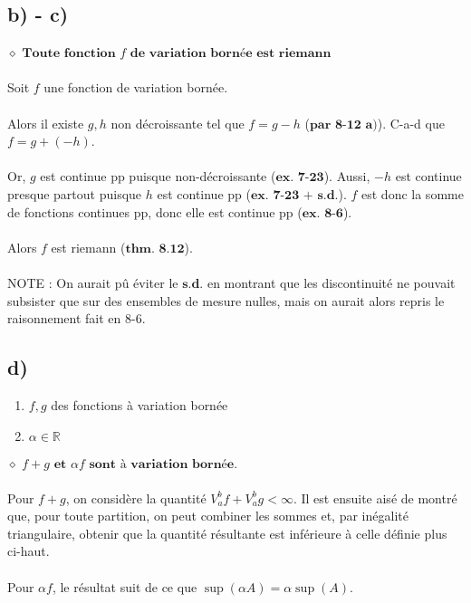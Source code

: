 \documentclass[a4paper,10pt]{article}
\begin{document}
\subsection*{b) - c)}
$\diamond$ $\textbf{Toute fonction } f \textbf{ de variation bornée est riemann}$
\\
\\
Soit $f$ une fonction de variation bornée. 
\\
\\
Alors il existe $g,h$ non décroissante tel que $f = g-h$ ($\textbf{par 8-12 a)}$).
C-a-d que $f = g+(-h)$. 
\\
\\
Or, $g$ est continue pp puisque non-décroissante ($\textbf{ex. 7-23}$). Aussi, $-h$ est continue presque partout puisque
$h$ est continue pp ($\textbf{ex. 7-23 + s.d.}$). $f$ est donc la somme de fonctions continues pp, donc elle est continue pp ($\textbf{ex. 8-6}$).
\\
\\
Alors $f$ est riemann ($\textbf{thm. 8.12}$).
\\
\\
NOTE : On aurait pû éviter le $\textbf{s.d.}$ en montrant que les discontinuité ne pouvait subsister que sur des ensembles de mesure nulles,
mais on aurait alors repris le raisonnement fait en 8-6.

\subsection*{d)}
\begin{enumerate}
 \item $f,g$ des fonctions à variation bornée
 \item $\alpha \in \mathbb{R}$
\end{enumerate}
$\diamond$ $f+g \textbf{ et } \alpha f \textbf{ sont à variation bornée.}$ 
\\
\\
Pour $f+g$, on considère la quantité $V_a^b f + V_a^b g < \infty$. Il est ensuite aisé de montré que,
pour toute partition, on peut combiner les sommes et, par inégalité triangulaire, obtenir que la quantité
résultante est inférieure à celle définie plus ci-haut.
\\
\\
Pour $\alpha f$, le résultat suit de ce que $\sup(\alpha A) = \alpha \sup(A)$.
\end{document}
